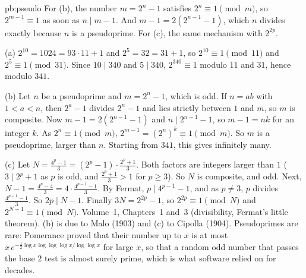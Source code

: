 \begin{solution}{pb:pseudo}
\idea For (b), the number $m=2^n-1$ satisfies $2^n\equiv1\pmod m$, so $2^{m-1}\equiv1$ as soon as $n\mid m-1$. And
$m-1=2(2^{n-1}-1)$, which $n$ divides exactly because $n$ is a pseudoprime. For (c), the same mechanism with $2^{2p}$.

\writeup (a) $2^{10}=1024=93\cdot11+1$ and $2^5=32=31+1$, so $2^{10}\equiv1\pmod{11}$ and $2^5\equiv1\pmod{31}$. Since $10\mid340$ and
$5\mid340$, $2^{340}\equiv1$ modulo $11$ and $31$, hence modulo $341$.

(b) Let $n$ be a pseudoprime and $m=2^n-1$, which is odd. If $n=ab$ with $1<a<n$, then $2^a-1$ divides $2^n-1$ and lies strictly
between $1$ and $m$, so $m$ is composite. Now $m-1=2(2^{n-1}-1)$ and $n\mid2^{n-1}-1$, so $m-1=nk$ for an integer $k$. As
$2^n\equiv1\pmod m$, $2^{m-1}=(2^n)^k\equiv1\pmod m$. So $m$ is a pseudoprime, larger than $n$. Starting from $341$, this gives
infinitely many.

(c) Let $N=\frac{4^p-1}3=(2^p-1)\cdot\frac{2^p+1}3$. Both factors are integers
larger than $1$ ($3\mid2^p+1$ as $p$ is odd, and $\frac{2^p+1}3>1$ for $p\ge3$). So $N$ is composite, and odd. Next,
$N-1=\frac{4^p-4}3=4\cdot\frac{4^{p-1}-1}3$. By Fermat, $p\mid4^{p-1}-1$, and as $p\ne3$, $p$ divides $\frac{4^{p-1}-1}3$. So $2p\mid N-1$.
Finally $3N=2^{2p}-1$, so $2^{2p}\equiv1\pmod N$ and $2^{N-1}\equiv1\pmod N$.
\tools Volume~1, Chapters~1 and~3 (divisibility, Fermat's little theorem).
\leads (b) is due to Malo (1903) and (c) to Cipolla (1904). Pseudoprimes are rare: Pomerance proved that their number up to $x$
is at most $x\,e^{-\frac12\log x\log\log\log x/\log\log x}$ for large $x$, so that a random odd number that passes the base $2$
test is almost surely prime, which is what software relied on for decades.
\end{solution}


